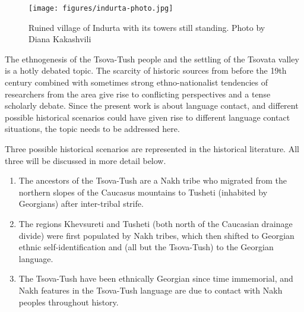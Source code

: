 \begin{figure}
	\texttt{[image: figures/indurta-photo.jpg]}
	\caption{Ruined village of Indurta with its towers still standing. Photo by Diana Kakashvili}
	\label{photo-indurta}
\end{figure}


The ethnogenesis of the Tsova-Tush people and the settling of the Tsovata valley is a hotly debated topic. The scarcity of historic sources from before the 19th century combined with sometimes strong ethno-nationalist tendencies of researchers from the area give rise to conflicting perspectives and a tense scholarly debate. Since the present work is about language contact, and different possible historical scenarios could have given rise to different language contact situations, the topic needs to be addressed here.

Three possible historical scenarios are represented in the historical literature. All three will be discussed in more detail below.

\begin{enumerate}
	\item The ancestors of the Tsova-Tush are a Nakh tribe who migrated from the northern slopes of the Caucasus mountains to Tusheti (inhabited by Georgians) after inter-tribal strife. 
	\item The regions Khevsureti and Tusheti (both north of the Caucasian drainage divide) were first populated by Nakh tribes, which then shifted to Georgian ethnic self-identification and (all but the Tsova-Tush) to the Georgian language.
	\item The Tsova-Tush have been ethnically Georgian since time immemorial, and Nakh features in the Tsova-Tush language are due to contact with Nakh peoples throughout history.
\end{enumerate}

